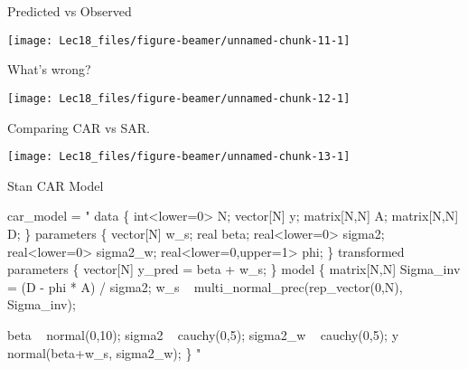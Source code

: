 \documentclass[11pt,ignorenonframetext,]{beamer}
\newenvironment{Shaded}{}{}
\newcommand{\NormalTok}[1]{#1}
\newcommand{\StringTok}[1]{\textcolor[rgb]{0.25,0.44,0.63}{#1}}
\let\oldShaded\Shaded
\let\endoldShaded\endShaded
\renewenvironment{Shaded}{\footnotesize\begin{spacing}{0.9}\oldShaded}{\endoldShaded\end{spacing}}
\let\oldverbatim\verbatim
\let\endoldverbatim\endverbatim
\newcommand{\scriptoutput}{
  \renewenvironment{Shaded}{\scriptsize\begin{spacing}{0.9}\oldShaded}{\endoldShaded\end{spacing}}
  \renewenvironment{verbatim}{\scriptsize\begin{spacing}{0.9}\oldverbatim}{\endoldverbatim\end{spacing}}
}
\begin{document}
\begin{frame}{Predicted vs Observed}
\protect\hypertarget{predicted-vs-observed}{}

\begin{center}\texttt{[image: Lec18\_files/figure-beamer/unnamed-chunk-11-1]} \end{center}

\end{frame}

\begin{frame}{What's wrong?}
\protect\hypertarget{whats-wrong}{}

\begin{center}\texttt{[image: Lec18\_files/figure-beamer/unnamed-chunk-12-1]} \end{center}

\end{frame}

\begin{frame}{Comparing CAR vs SAR.}
\protect\hypertarget{comparing-car-vs-sar.}{}

\begin{center}\texttt{[image: Lec18\_files/figure-beamer/unnamed-chunk-13-1]} \end{center}

\end{frame}

\begin{frame}[fragile,t]{Stan CAR Model}
\protect\hypertarget{stan-car-model}{}

\scriptoutput

\begin{Shaded}
\begin{Highlighting}[]
\NormalTok{car_model =}\StringTok{ "}
\StringTok{data \{}
\StringTok{  int<lower=0> N;}
\StringTok{  vector[N] y;}
\StringTok{  matrix[N,N] A;}
\StringTok{  matrix[N,N] D;}
\StringTok{\}}
\StringTok{parameters \{}
\StringTok{  vector[N] w_s;}
\StringTok{  real beta;}
\StringTok{  real<lower=0> sigma2;}
\StringTok{  real<lower=0> sigma2_w;}
\StringTok{  real<lower=0,upper=1> phi;}
\StringTok{\}}
\StringTok{transformed parameters \{}
\StringTok{  vector[N] y_pred = beta + w_s;}
\StringTok{\}}
\StringTok{model \{}
\StringTok{  matrix[N,N] Sigma_inv = (D - phi * A) / sigma2;}
\StringTok{  w_s ~ multi_normal_prec(rep_vector(0,N), Sigma_inv);}

\StringTok{  beta ~ normal(0,10);}
\StringTok{  sigma2 ~ cauchy(0,5);}
\StringTok{  sigma2_w ~ cauchy(0,5);}
\StringTok{  }
\StringTok{  y ~ normal(beta+w_s, sigma2_w);}
\StringTok{\}}
\StringTok{"}
\end{Highlighting}
\end{Shaded}

\end{frame}
\end{document}
